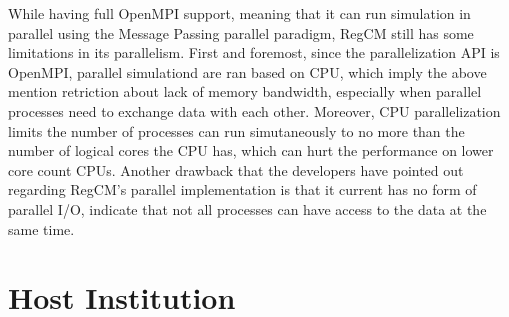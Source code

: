 While having full OpenMPI support, meaning that it can run simulation in parallel using the Message Passing parallel paradigm, RegCM still has some limitations in its parallelism. First and foremost, since the parallelization API is OpenMPI, parallel simulationd are ran based on CPU, which imply the above mention retriction about lack of memory bandwidth, especially when parallel processes need to exchange data with each other. Moreover, CPU parallelization limits the number of processes can run simutaneously to no more than the number of logical cores the CPU has, which can hurt the performance on lower core count CPUs. Another drawback that the developers have pointed out regarding RegCM's parallel implementation is that it current has no form of parallel I/O, indicate that not all processes can have access to the data at the same time. \\

\section{Host Institution}

